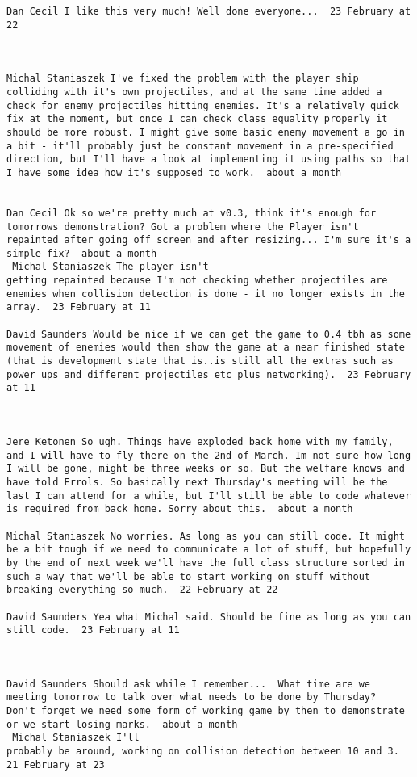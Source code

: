 \documentclass[10pt]{report}
\begin{document}
\begin{verbatim}
Dan Cecil I like this very much! Well done everyone...  23 February at
22



Michal Staniaszek I've fixed the problem with the player ship
colliding with it's own projectiles, and at the same time added a
check for enemy projectiles hitting enemies. It's a relatively quick
fix at the moment, but once I can check class equality properly it
should be more robust. I might give some basic enemy movement a go in
a bit - it'll probably just be constant movement in a pre-specified
direction, but I'll have a look at implementing it using paths so that
I have some idea how it's supposed to work.  about a month 


Dan Cecil Ok so we're pretty much at v0.3, think it's enough for
tomorrows demonstration? Got a problem where the Player isn't
repainted after going off screen and after resizing... I'm sure it's a
simple fix?  about a month 
 Michal Staniaszek The player isn't
getting repainted because I'm not checking whether projectiles are
enemies when collision detection is done - it no longer exists in the
array.  23 February at 11

David Saunders Would be nice if we can get the game to 0.4 tbh as some
movement of enemies would then show the game at a near finished state
(that is development state that is..is still all the extras such as
power ups and different projectiles etc plus networking).  23 February
at 11



Jere Ketonen So ugh. Things have exploded back home with my family,
and I will have to fly there on the 2nd of March. Im not sure how long
I will be gone, might be three weeks or so. But the welfare knows and
have told Errols. So basically next Thursday's meeting will be the
last I can attend for a while, but I'll still be able to code whatever
is required from back home. Sorry about this.  about a month 

Michal Staniaszek No worries. As long as you can still code. It might
be a bit tough if we need to communicate a lot of stuff, but hopefully
by the end of next week we'll have the full class structure sorted in
such a way that we'll be able to start working on stuff without
breaking everything so much.  22 February at 22

David Saunders Yea what Michal said. Should be fine as long as you can
still code.  23 February at 11



David Saunders Should ask while I remember...  What time are we
meeting tomorrow to talk over what needs to be done by Thursday?
Don't forget we need some form of working game by then to demonstrate
or we start losing marks.  about a month 
 Michal Staniaszek I'll
probably be around, working on collision detection between 10 and 3.
21 February at 23




\end{verbatim}
\end{document}
